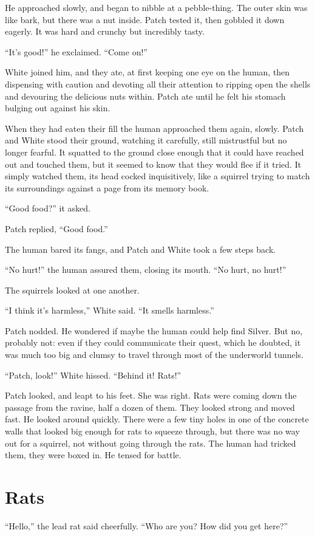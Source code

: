 \documentclass[ebook,oneside,openany,17pt]{memoir}
\renewcommand{\thechapter}{\Roman{chapter}}
\newcounter{sections}
\newcommand{\sections}[1]{%
  \section*{#1}
  \addtocounter{sections}{1}%
  \pdfbookmark[1]{#1}{section.\thechapter.\thesections}}
\begin{document}
He approached slowly, and began to nibble at a pebble-thing. The outer
skin was like bark, but there was a nut inside. Patch tested it, then
gobbled it down eagerly. It was hard and crunchy but incredibly tasty.

“It’s good!” he exclaimed. “Come on!”

White joined him, and they ate, at first keeping one eye on the human,
then dispensing with caution and devoting all their attention to
ripping open the shells and devouring the delicious nuts within. Patch
ate until he felt his stomach bulging out against his skin.

When they had eaten their fill the human approached them again,
slowly. Patch and White stood their ground, watching it carefully,
still mistrustful but no longer fearful. It squatted to the ground
close enough that it could have reached out and touched them, but it
seemed to know that they would flee if it tried. It simply watched
them, its head cocked inquisitively, like a squirrel trying to match
its surroundings against a page from its memory book.

“Good food?” it asked.

Patch replied, “Good food.”

The human bared its fangs, and Patch and White took a few steps back.

“No hurt!” the human assured them, closing its mouth. “No hurt, no
hurt!”

The squirrels looked at one another.

“I think it’s harmless,” White said. “It smells harmless.”

Patch nodded. He wondered if maybe the human could help find
Silver. But no, probably not: even if they could communicate their
quest, which he doubted, it was much too big and clumsy to travel
through most of the underworld tunnels.

“Patch, look!” White hissed. “Behind it! Rats!”

Patch looked, and leapt to his feet. She was right. Rats were coming
down the passage from the ravine, half a dozen of them. They looked
strong and moved fast. He looked around quickly. There were a few tiny
holes in one of the concrete walls that looked big enough for rats to
squeeze through, but there was no way out for a squirrel, not without
going through the rats. The human had tricked them, they were boxed
in. He tensed for battle.


\sections{Rats}

“Hello,” the lead rat said cheerfully. “Who are you? How did you get
here?”
\end{document}
